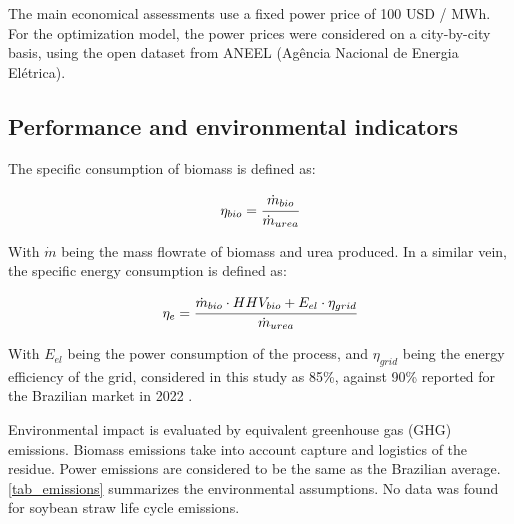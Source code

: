 \documentclass[a4paper, titlepage]{article}
\begin{document}
The main economical assessments use a fixed power price of 100 USD / MWh. For the optimization model, the power prices
were considered on a city-by-city basis, using the open dataset from ANEEL (Agência Nacional de Energia Elétrica). 
\cite{ANEELPortalReports}

\subsection{Performance and environmental indicators}

The specific consumption of biomass is defined as:

\begin{equation}
	\eta_{bio} = \cfrac{\dot m_{bio}}{\dot m_{urea}}
\end{equation}

With $\dot m$ being the mass flowrate of biomass and urea produced. In a similar vein, the specific energy consumption
is defined as:

\begin{equation}
	\eta _e = \cfrac{\dot m_{bio} \cdot HHV_{bio} + E_{el} \cdot \eta _{grid}}{\dot m_{urea}}
\end{equation}

With $E_{el}$ being the power consumption of the process, and $\eta _{grid}$ being the energy efficiency of the grid,
considered in this study as 85\%, against 90\% reported for the Brazilian market in 2022
\cite{epeBENBalancoEnergetico2023}.

Environmental impact is evaluated by equivalent greenhouse gas (GHG) emissions. Biomass emissions take into account
capture and logistics of the residue. Power emissions are considered to be the same as the Brazilian average.
\autoref{tab_emissions} summarizes the environmental assumptions. No data was found for soybean straw life cycle emissions.
\end{document}
